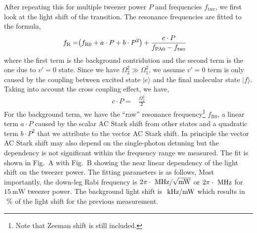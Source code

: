 After repeating this for multiple tweezer power $P$ and frequencies $f_{\mathrm{twr}}$,
we first look at the light shift of the transition.
The resonance frequencies are fitted to the formula,
\begin{align*}
  f_{\mathrm{R}}=&\paren{f_{\mathrm{R}0}+a\cdot P+b\cdot P^2}
                   +\frac{c\cdot P}{f_{\mathrm{PA0}} - f_{\mathrm{twr}}}
\end{align*}
where the first term is the background contridution
and the second term is the one due to $v'=0$ state.
Since we have $\Omega_2^2\gg\Omega_1^2$, we assume $v'=0$ term is only caused by
the coupling between excited state $|e\rangle$ and the final molecular state $|f\rangle$.
Taking into account the cross coupling effect, we have,
\begin{align*}
  c\cdot P=&\frac{\Omega_2^2}{2}
\end{align*}
For the background term, we have the ``raw'' resonance frequency\footnote{
  Note that Zeeman shift is still included.} $f_{\mathrm{R}0}$,
a linear term $a\cdot P$ caused by the scalar AC Stark shift from other states
and a quadratic term $b\cdot P^2$ that we attribute to the vector AC Stark shift.
In principle the vector AC Stark shift may also depend on the single-photon detuning
but the dependency is not significant within the frequency range we measured.
The fit is shown in Fig.~A with Fig.~B showing
the near linear dependency of the light shift on the tweezer power.
The fitting parameters is as follows,
Most importantly, the down-leg Rabi frequency is $2\pi\cdot\todo{number}~\mathrm{MHz/\sqrt{mW}}$
or $2\pi\cdot\todo{number}~\mathrm{MHz}$ for $15~\mathrm{mW}$ tweezer power.
The background light shift is $\todo{number}~\mathrm{kHz/mW}$
which results in $\todo{number}~\mathrm{\%}$ of the light shift for the previous measurement.

